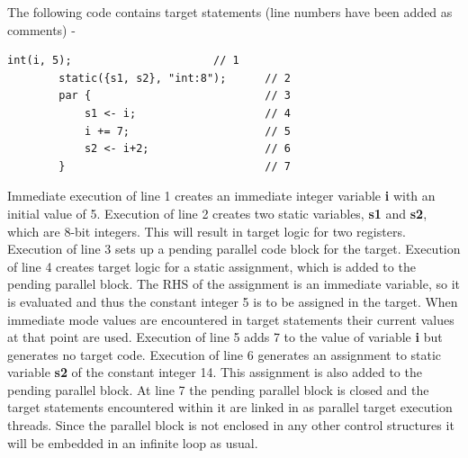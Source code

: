 \documentclass[10pt,a4paper,twoside,fleqn]{article}
\newcommand{\var}[1]{{\bf #1}} %
\begin{document}
\pagebreak    
    The following code contains target statements (line numbers have been added
    as comments) -
    \begin{lstlisting}[language=threepl]
        int(i, 5);                      // 1
        static({s1, s2}, "int:8");      // 2
        par {                           // 3
            s1 <- i;                    // 4
            i += 7;                     // 5
            s2 <- i+2;                  // 6
        }                               // 7
    \end{lstlisting}
    Immediate execution of line 1 creates an immediate integer variable \var{i}
    with an initial value of 5. Execution of line 2 creates two static
    variables, \var{s1} and \var{s2}, which are 8-bit integers. This will result
    in target logic for two registers. Execution of line 3 sets up a pending
    parallel code block for the target. Execution of line 4 creates target logic
    for a static assignment, which is added to the pending parallel block. The
    RHS of the assignment is an immediate variable, so it is evaluated and thus
    the constant integer 5 is to be assigned in the target. When immediate mode
    values are encountered in target statements their current values at that
    point are used. Execution of line 5 adds 7 to the value of variable \var{i}
    but generates no target code. Execution of line 6 generates an assignment to
    static variable \var{s2} of the constant integer 14. This assignment is also
    added to the pending parallel block. At line 7 the pending parallel block is
    closed and the target statements encountered within it are linked in as
    parallel target execution threads. Since the parallel block is not enclosed
    in any other control structures it will be embedded in an infinite loop as
    usual.
    
\end{document}
